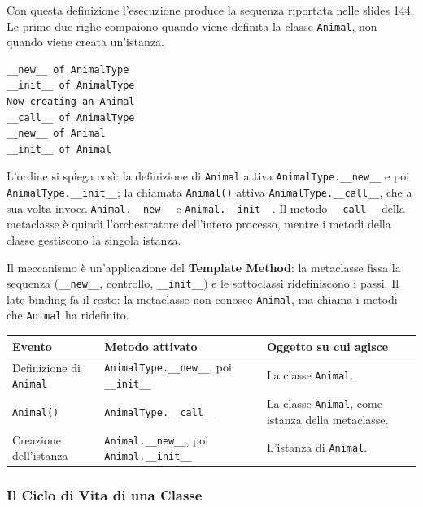 \documentclass[12pt]{extarticle}
\begin{document}
\noindent Con questa definizione l'esecuzione produce la sequenza riportata nelle slides 144. Le prime due righe compaiono quando viene definita la classe \texttt{Animal}, non quando viene creata un'istanza.

\begin{lstlisting}[numbers=none]
__new__ of AnimalType
__init__ of AnimalType
Now creating an Animal
__call__ of AnimalType
__new__ of Animal
__init__ of Animal
\end{lstlisting}

{\sloppy
\noindent L'ordine si spiega così: la definizione di \texttt{Animal} attiva \texttt{AnimalType.\_\_new\_\_} e poi \texttt{AnimalType.\_\_init\_\_}; la chiamata \texttt{Animal()} attiva \texttt{AnimalType.\_\_call\_\_}, che a sua volta invoca \texttt{Animal.\_\_new\_\_} e \texttt{Animal.\_\_init\_\_}. Il metodo \texttt{\_\_call\_\_} della metaclasse è quindi l'orchestratore dell'intero processo, mentre i metodi della classe gestiscono la singola istanza.\par}

\noindent Il meccanismo è un'applicazione del \textbf{Template Method}: la metaclasse fissa la sequenza (\texttt{\_\_new\_\_}, controllo, \texttt{\_\_init\_\_}) e le sottoclassi ridefiniscono i passi. Il late binding fa il resto: la metaclasse non conosce \texttt{Animal}, ma chiama i metodi che \texttt{Animal} ha ridefinito.

\begin{center}
\small
\begin{tabular}{p{3.9cm}p{6.9cm}p{5.2cm}}
    \toprule
    \textbf{Evento} & \textbf{Metodo attivato} & \textbf{Oggetto su cui agisce} \\
    \midrule
    Definizione di \texttt{Animal} & \texttt{AnimalType.\_\_new\_\_}, poi \texttt{\_\_init\_\_} & La classe \texttt{Animal}. \\
    \addlinespace
    \texttt{Animal()} & \texttt{AnimalType.\_\_call\_\_} & La classe \texttt{Animal}, come istanza della metaclasse. \\
    \addlinespace
    Creazione dell'istanza & \texttt{Animal.\_\_new\_\_}, poi \texttt{Animal.\_\_init\_\_} & L'istanza di \texttt{Animal}. \\
    \bottomrule
\end{tabular}
\end{center}

\subsubsection{Il Ciclo di Vita di una Classe}
\end{document}
